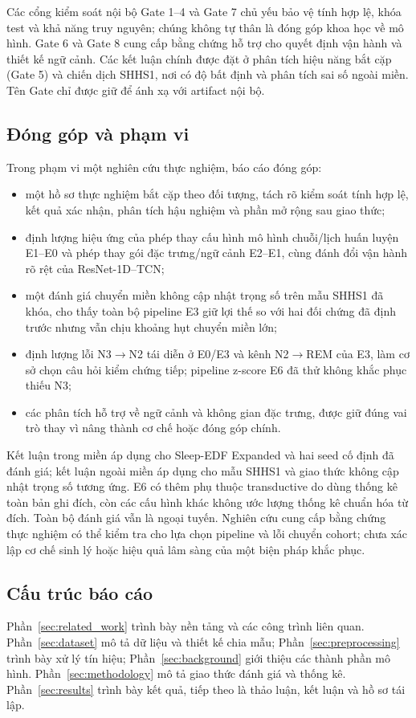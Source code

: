 Các cổng kiểm soát nội bộ Gate 1--4 và Gate 7 chủ yếu bảo vệ tính hợp lệ, khóa test và khả năng truy nguyên; chúng không tự thân là đóng góp khoa học về mô hình. Gate 6 và Gate 8 cung cấp bằng chứng hỗ trợ cho quyết định vận hành và thiết kế ngữ cảnh. Các kết luận chính được đặt ở phân tích hiệu năng bắt cặp (Gate 5) và chiến dịch SHHS1, nơi có độ bất định và phân tích sai số ngoài miền. Tên Gate chỉ được giữ để ánh xạ với artifact nội bộ.

\subsection{Đóng góp và phạm vi}

Trong phạm vi một nghiên cứu thực nghiệm, báo cáo đóng góp:

\begin{itemize}
  \item một hồ sơ thực nghiệm bắt cặp theo đối tượng, tách rõ kiểm soát tính hợp lệ, kết quả xác nhận, phân tích hậu nghiệm và phần mở rộng sau giao thức;
  \item định lượng hiệu ứng của phép thay cấu hình mô hình chuỗi/lịch huấn luyện E1--E0 và phép thay gói đặc trưng/ngữ cảnh E2--E1, cùng đánh đổi vận hành rõ rệt của ResNet-1D--TCN;
  \item một đánh giá chuyển miền không cập nhật trọng số trên mẫu SHHS1 đã khóa, cho thấy toàn bộ pipeline E3 giữ lợi thế so với hai đối chứng đã định trước nhưng vẫn chịu khoảng hụt chuyển miền lớn;
  \item định lượng lỗi N3$\rightarrow$N2 tái diễn ở E0/E3 và kênh N2$\rightarrow$REM của E3, làm cơ sở chọn câu hỏi kiểm chứng tiếp; pipeline z-score E6 đã thử không khắc phục thiếu N3;
  \item các phân tích hỗ trợ về ngữ cảnh và không gian đặc trưng, được giữ đúng vai trò thay vì nâng thành cơ chế hoặc đóng góp chính.
\end{itemize}

Kết luận trong miền áp dụng cho Sleep-EDF Expanded và hai seed cố định đã đánh giá; kết luận ngoài miền áp dụng cho mẫu SHHS1 và giao thức không cập nhật trọng số tương ứng. E6 có thêm phụ thuộc transductive do dùng thống kê toàn bản ghi đích, còn các cấu hình khác không ước lượng thống kê chuẩn hóa từ đích. Toàn bộ đánh giá vẫn là ngoại tuyến. Nghiên cứu cung cấp bằng chứng thực nghiệm có thể kiểm tra cho lựa chọn pipeline và lỗi chuyển cohort; chưa xác lập cơ chế sinh lý hoặc hiệu quả lâm sàng của một biện pháp khắc phục.

\subsection{Cấu trúc báo cáo}

Phần~\ref{sec:related_work} trình bày nền tảng và các công trình liên quan. Phần~\ref{sec:dataset} mô tả dữ liệu và thiết kế chia mẫu; Phần~\ref{sec:preprocessing} trình bày xử lý tín hiệu; Phần~\ref{sec:background} giới thiệu các thành phần mô hình. Phần~\ref{sec:methodology} mô tả giao thức đánh giá và thống kê. Phần~\ref{sec:results} trình bày kết quả, tiếp theo là thảo luận, kết luận và hồ sơ tái lập.

